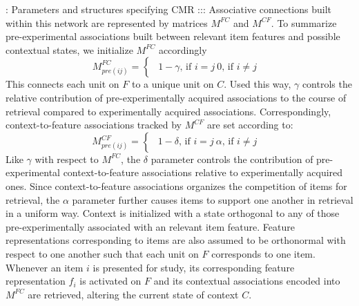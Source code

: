 {}: Parameters and structures specifying CMR :::\markdownRendererInterblockSeparator
{}\markdownRendererInterblockSeparator
{}Associative connections built within this network are represented by matrices $M^{FC}$ and $M^{CF}$.\markdownRendererInterblockSeparator
{}To summarize pre-experimental associations built between relevant item features and possible contextual states, we initialize $M^{FC}$ accordingly\markdownRendererInterblockSeparator
{}$$M^{FC}_{pre(ij)} = \begin{cases} \begin{alignedat}{2} 1 - \gamma \text{, if } i=j \ 0 \text{, if } i \neq j\ \end{alignedat} \end{cases}$$\markdownRendererInterblockSeparator
{}This connects each unit on $F$ to a unique unit on $C$. Used this way, $\gamma$ controls the relative contribution of pre-experimentally acquired associations to the course of retrieval compared to experimentally acquired associations. Correspondingly, context-to-feature associations tracked by $M^{CF}$ are set according to:\markdownRendererInterblockSeparator
{}$$M^{CF}_{pre(ij)} = \begin{cases} \begin{alignedat}{2} 1 - \delta \text{, if } i=j \ \alpha \text{, if } i \neq j\ \end{alignedat} \end{cases}$$\markdownRendererInterblockSeparator
{}Like $\gamma$ with respect to $M^{FC}$, the $\delta$ parameter controls the contribution of pre-experimental context-to-feature associations relative to experimentally acquired ones. Since context-to-feature associations organizes the competition of items for retrieval, the $\alpha$ parameter further causes items to support one another in retrieval in a uniform way.\markdownRendererInterblockSeparator
{}Context is initialized with a state orthogonal to any of those pre-experimentally associated with an relevant item feature. Feature representations corresponding to items are also assumed to be orthonormal with respect to one another such that each unit on $F$ corresponds to one item.\markdownRendererInterblockSeparator
{}\markdownRendererInterblockSeparator
{}Whenever an item $i$ is presented for study, its corresponding feature representation $f_i$ is activated on $F$ and its contextual associations encoded into $M^{FC}$ are retrieved, altering the current state of context $C$.\markdownRendererInterblockSeparator
